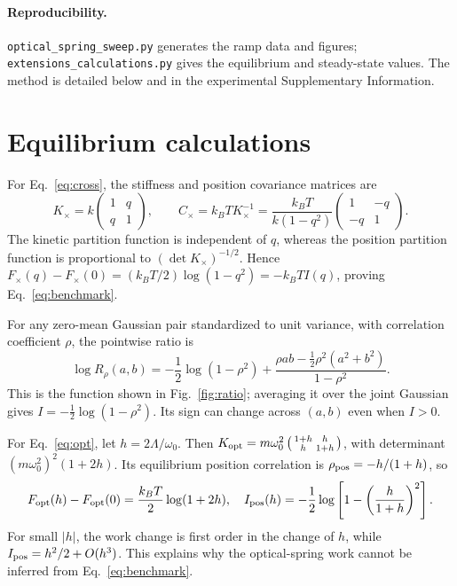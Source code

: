 \documentclass[10pt]{article}
\begin{document}
\paragraph{Reproducibility.} \texttt{optical\_spring\_sweep.py} generates the ramp data and figures; \texttt{extensions\_calculations.py} gives the equilibrium and steady-state values. The method is detailed below and in the experimental Supplementary Information.\cite{yangsupp}

\appendix
\section{Equilibrium calculations}\label{app:equilibrium}
For Eq.~\eqref{eq:cross}, the stiffness and position covariance matrices are
\begin{equation}
 K_\times=k\begin{pmatrix}1&q\\q&1\end{pmatrix},\qquad
 C_\times=k_BT K_\times^{-1}
 =\frac{k_BT}{k(1-q^2)}
 \begin{pmatrix}1&-q\\-q&1\end{pmatrix}.
\end{equation}
The kinetic partition function is independent of $q$, whereas the position partition function is proportional to $(\det K_\times)^{-1/2}$. Hence $F_\times(q)-F_\times(0)=(k_BT/2)\log(1-q^2)=-k_BT I(q)$, proving Eq.~\eqref{eq:benchmark}.

For any zero-mean Gaussian pair standardized to unit variance, with correlation coefficient $\rho$, the pointwise ratio is
\begin{equation}
 \log R_\rho(a,b)=-\frac12\log(1-\rho^2)
 +\frac{\rho ab-\frac12\rho^2(a^2+b^2)}{1-\rho^2}.
 \label{eq:pairratio}
\end{equation}
This is the function shown in Fig.~\ref{fig:ratio}; averaging it over the joint Gaussian gives $I=-\frac12\log(1-\rho^2)$. Its sign can change across $(a,b)$ even when $I>0$.

For Eq.~\eqref{eq:opt}, let $h=2\Lambda/\omega_0$. Then $K_{\rm opt}=m\omega_0^2\left(\begin{smallmatrix}1+h&h\\h&1+h\end{smallmatrix}\right)$, with determinant $(m\omega_0^2)^2(1+2h)$. Its equilibrium position correlation is $\rho_{\rm pos}=-h/(1+h)$, so
\begin{equation}
 F_{\rm opt}(h)-F_{\rm opt}(0)=\frac{k_BT}{2}\log(1+2h),\quad
 I_{\rm pos}(h)=-\frac12\log\left[1-\left(\frac{h}{1+h}\right)^2\right].
\end{equation}
For small $|h|$, the work change is first order in the change of $h$, while $I_{\rm pos}=h^2/2+O(h^3)$. This explains why the optical-spring work cannot be inferred from Eq.~\eqref{eq:benchmark}.
\end{document}
